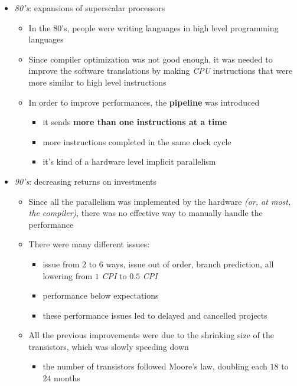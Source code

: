 \documentclass[english]{article}
\begin{document}
\begin{itemize}
  \item \textit{80's}: expansions of superscalar processors
        \begin{itemize}
          \item In the 80's, people were writing languages in high level programming languages
          \item Since compiler optimization was not good enough, it was needed to improve the software translations by making \textit{CPU} instructions that were more similar to high level instructions
          \item In order to improve performances, the \textbf{pipeline} was introduced
                \begin{itemize}
                  \item it sends \textbf{more than one instructions at a time}
                  \item more instructions completed in the same clock cycle
                  \item it's kind of a hardware level implicit parallelism
                \end{itemize}
        \end{itemize}
  \item \textit{90's}: decreasing returns on investments
        \begin{itemize}
          \item Since all the parallelism was implemented by the hardware \textit{(or, at most, the compiler)}, there was no effective way to manually handle the performance
          \item There were many different issues:
                \begin{itemize}
                  \item issue from \(2\) to \(6\) ways, issue out of order, branch prediction, all lowering from \(1\) \textit{CPI} to \(0.5\) \textit{CPI}
                  \item performance below expectations
                  \item these performance issues led to delayed and cancelled projects
                \end{itemize}
          \item All the previous improvements were due to the shrinking size of the transistors, which was slowly speeding down
                \begin{itemize}
                  \item the number of transistors followed Moore's law, doubling each \(18\) to \(24\) months

\end{itemize}
\end{itemize}
\end{itemize}
\end{document}
